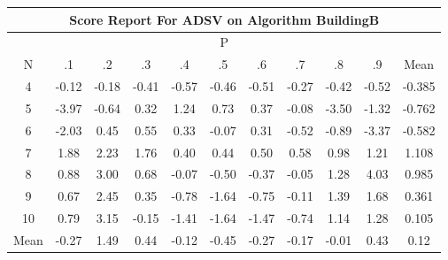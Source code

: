 \documentclass[11pt,a4paper]{report}
\begin{document}
\begin{longtable}{ | c || c | c | c | c | c | c | c | c | c || c |}
\hline
\multicolumn{11}{|c|}{ Score Report For ADSV on Algorithm BuildingB} \\
\hline
\multicolumn{11}{|c|}{ P } \\
\hline
N & .1 & .2 & .3 & .4 & .5 & .6 & .7 & .8 & .9 & Mean\\
 \hline
 \hline
 \endhead
  4 &  \cellcolor[HTML]{FFFFFF} -0.12 &  \cellcolor[HTML]{FFF7F7} -0.18 &  \cellcolor[HTML]{FFF7F7} -0.41 &  \cellcolor[HTML]{FFEFEF} -0.57 &  \cellcolor[HTML]{FFF7F7} -0.46 &  \cellcolor[HTML]{FFEFEF} -0.51 &  \cellcolor[HTML]{FFF7F7} -0.27 &  \cellcolor[HTML]{FFF7F7} -0.42 &  \cellcolor[HTML]{FFEFEF} -0.52 & -0.385 \\
  5 &  \cellcolor[HTML]{FF9F9F} -3.97 &  \cellcolor[HTML]{FFEFEF} -0.64 &  \cellcolor[HTML]{F7F7FF} 0.32 &  \cellcolor[HTML]{DFDFFF} 1.24 &  \cellcolor[HTML]{EFEFFF} 0.73 &  \cellcolor[HTML]{F7F7FF} 0.37 &  \cellcolor[HTML]{FFFFFF} -0.08 &  \cellcolor[HTML]{FFA7A7} -3.50 &  \cellcolor[HTML]{FFDFDF} -1.32 & -0.762 \\
  6 &  \cellcolor[HTML]{FFCFCF} -2.03 &  \cellcolor[HTML]{F7F7FF} 0.45 &  \cellcolor[HTML]{EFEFFF} 0.55 &  \cellcolor[HTML]{F7F7FF} 0.33 &  \cellcolor[HTML]{FFFFFF} -0.07 &  \cellcolor[HTML]{F7F7FF} 0.31 &  \cellcolor[HTML]{FFEFEF} -0.52 &  \cellcolor[HTML]{FFE7E7} -0.89 &  \cellcolor[HTML]{FFA7A7} -3.37 & -0.582 \\
  7 &  \cellcolor[HTML]{CFCFFF} 1.88 &  \cellcolor[HTML]{C7C7FF} 2.23 &  \cellcolor[HTML]{CFCFFF} 1.76 &  \cellcolor[HTML]{F7F7FF} 0.40 &  \cellcolor[HTML]{F7F7FF} 0.44 &  \cellcolor[HTML]{EFEFFF} 0.50 &  \cellcolor[HTML]{EFEFFF} 0.58 &  \cellcolor[HTML]{E7E7FF} 0.98 &  \cellcolor[HTML]{DFDFFF} 1.21 & 1.108 \\
  8 &  \cellcolor[HTML]{E7E7FF} 0.88 &  \cellcolor[HTML]{B7B7FF} 3.00 &  \cellcolor[HTML]{EFEFFF} 0.68 &  \cellcolor[HTML]{FFFFFF} -0.07 &  \cellcolor[HTML]{FFEFEF} -0.50 &  \cellcolor[HTML]{FFF7F7} -0.37 &  \cellcolor[HTML]{FFFFFF} -0.05 &  \cellcolor[HTML]{DFDFFF} 1.28 &  \cellcolor[HTML]{9797FF} 4.03 & 0.985 \\
  9 &  \cellcolor[HTML]{EFEFFF} 0.67 &  \cellcolor[HTML]{BFBFFF} 2.45 &  \cellcolor[HTML]{F7F7FF} 0.35 &  \cellcolor[HTML]{FFEFEF} -0.78 &  \cellcolor[HTML]{FFD7D7} -1.64 &  \cellcolor[HTML]{FFEFEF} -0.75 &  \cellcolor[HTML]{FFFFFF} -0.11 &  \cellcolor[HTML]{DFDFFF} 1.39 &  \cellcolor[HTML]{D7D7FF} 1.68 & 0.361 \\
  10 &  \cellcolor[HTML]{EFEFFF} 0.79 &  \cellcolor[HTML]{AFAFFF} 3.15 &  \cellcolor[HTML]{FFFFFF} -0.15 &  \cellcolor[HTML]{FFDFDF} -1.41 &  \cellcolor[HTML]{FFD7D7} -1.64 &  \cellcolor[HTML]{FFD7D7} -1.47 &  \cellcolor[HTML]{FFEFEF} -0.74 &  \cellcolor[HTML]{DFDFFF} 1.14 &  \cellcolor[HTML]{DFDFFF} 1.28 & 0.105 \\
 \hline
 \hline
Mean &  \cellcolor[HTML]{FFF7F7} -0.27 &  \cellcolor[HTML]{D7D7FF} 1.49 &  \cellcolor[HTML]{F7F7FF} 0.44 &  \cellcolor[HTML]{FFFFFF} -0.12 &  \cellcolor[HTML]{FFF7F7} -0.45 &  \cellcolor[HTML]{FFF7F7} -0.27 &  \cellcolor[HTML]{FFF7F7} -0.17 &  \cellcolor[HTML]{FFFFFF} -0.01 &  \cellcolor[HTML]{F7F7FF} 0.43 &  \cellcolor[HTML]{FFFFFF} 0.12
\end{longtable}
\end{document}
